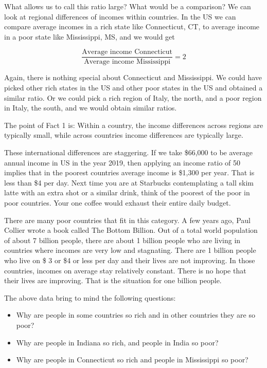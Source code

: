 \documentclass[
]{book}
\providecommand{\tightlist}{%
  \setlength{\itemsep}{0pt}\setlength{\parskip}{0pt}}
\begin{document}
What allows us to call this ratio large? What would be a comparison? We can look at regional differences of incomes within countries. In the US we can compare average incomes in a rich state like Connecticut, CT, to average income in a poor state like Mississippi, MS, and we would get

\[\frac{\text{Average income Connecticut}}{\text{Average income Mississippi}}=2\]

Again, there is nothing special about Connecticut and Mississippi. We could have picked other rich states in the US and other poor states in the US and obtained a similar ratio. Or we could pick a rich region of Italy, the north, and a poor region in Italy, the south, and we would obtain similar ratios.

The point of Fact 1 is: Within a country, the income differences across regions are typically small, while across countries income differences are typically large.

These international differences are staggering. If we take \$66,000 to be average annual income in US in the year 2019, then applying an income ratio of 50 implies that in the poorest countries average income is \$1,300 per year. That is less than \$4 per day. Next time you are at Starbucks contemplating a tall skim latte with an extra shot or a similar drink, think of the poorest of the poor in poor countries. Your one coffee would exhaust their entire daily budget.

There are many poor countries that fit in this category. A few years ago, Paul Collier wrote a book called The Bottom Billion. Out of a total world population of about 7 billion people, there are about 1 billion people who are living in countries where incomes are very low and stagnating. There are 1 billion people who live on \$ 3 or \$4 or less per day and their lives are not improving. In those countries, incomes on average stay relatively constant. There is no hope that their lives are improving. That is the situation for one billion people.

The above data bring to mind the following questions:

\begin{itemize}
\tightlist
\item
  Why are people in some countries so rich and in other countries they are so poor?
\item
  Why are people in Indiana so rich, and people in India so poor?
\item
  Why are people in Connecticut so rich and people in Mississippi so poor?
\end{itemize}
\end{document}
